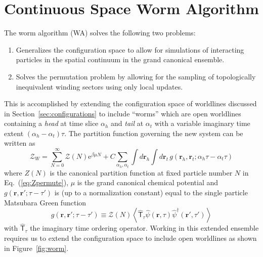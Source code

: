 \documentclass[prb,aps,amssym,nofootinbib,floatfix,notitlepage]{revtex4-1}
\renewcommand{\vec}[1]{\boldsymbol{#1}}
\newcommand{\e}[1]{\mathrm{e}^{#1}}
\renewcommand{\eqref}[1]{Eq.~(\ref{#1})}
\begin{document}
\section{Continuous Space Worm Algorithm}

The worm algorithm \cite{Boninsegni:2006ed,Boninsegni:2006gc} (WA) solves the following two problems:
\begin{enumerate}
    \item Generalizes the configuration space to allow for simulations of
        interacting particles in the spatial continuum in the grand canonical
        ensemble.
    \item Solves the permutation problem by allowing for the sampling of
        topologically inequivalent winding sectors using only local updates.
\end{enumerate}
This is accomplished by extending the configuration space of worldlines
discussed in Section~\ref{sec:configurations} to include ``worms'' which are
open worldlines containing a \emph{head} at time slice $\alpha_h $ and \emph{tail} at
$\alpha_t$ with a variable imaginary time extent $(\alpha_h -
\alpha_t)\tau$.  The partition function governing the new system can be written
as
%
\begin{equation}
    \mathcal{Z}_W = \sum_{N=0}^{\infty} \mathcal{Z}(N) \e{\beta \mu N} + C
    \sum_{\alpha_h,\alpha_t} \int d\vec{r}_h \int d\vec{r}_t\,
    g\left(\vec{r}_h,\vec{r}_t; \alpha_h\tau-\alpha_t \tau\right)
\end{equation}
%
where $Z(N)$ is the canonical partition function at fixed particle number $N$
in \eqref{eq:Zpermute}, $\mu$ is the grand canonical chemical potential and
$g(\vec{r},\vec{r'};\tau-\tau')$ is (up to a normalization constant)
equal to the single particle Matsubara Green function
%
\begin{equation}
    g(\vec{r},\vec{r'};\tau-\tau') \equiv \mathcal{Z}(N)\left \langle 
\hat{\mathsf{T}}_\tau \hat{\psi}(\vec{r},\tau)\hat{\psi}^\dagger(\vec{r}',\tau')
\right \rangle
\end{equation}
%
with $\hat{\mathsf{T}}_\tau$ the imaginary time ordering operator. Working
in this extended ensemble requires us to extend the configuration space to
include open worldlines as shown in Figure~\ref{fig:worm}.  
%
\end{document}
